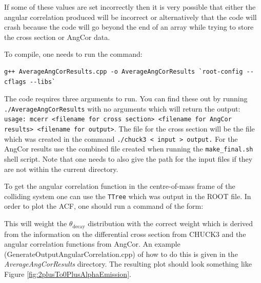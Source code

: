 \documentclass[a4paper,10pt]{article}
\begin{document}
If some of these values are set incorrectly then it is very possible that either the angular correlation produced will be incorrect or alternatively that the code will crash because the code will go beyond the end of an array while trying to store the cross section or AngCor data.

To compile, one needs to run the command:

\begin{verbatim}
g++ AverageAngCorResults.cpp -o AverageAngCorResults `root-config --cflags --libs` 
\end{verbatim}

The code requires three arguments to run. You can find these out by running \texttt{./AverageAngCorResults} with no arguments which will return the output: \texttt{usage: mcerr <filename for cross section> <filename for AngCor results> <filename for output>}. The file for the cross section will be the file which was created in the command \texttt{./chuck3 < input > output.} For the AngCor results use the combined file created when running the \texttt{make_final.sh} shell script. Note that one needs to also give the path for the input files if they are not within the current directory.
 
To get the angular correlation function in the centre-of-mass frame of the colliding system one can use the \texttt{TTree} which was output in the ROOT file. In order to plot the ACF, one should run a command of the form:

This will weight the $\theta_{\mathrm{decay}}$ distribution with the correct weight which is derived from the information on the differential cross section from CHUCK3 and the angular correlation functions from AngCor. An example (GenerateOutputAngularCorrelation.cpp) of how to do this is given in the {\it AverageAngCorResults} directory. The resulting plot should look something like Figure \ref{fig:2plusTo0PlusAlphaEmission}.
\end{document}
